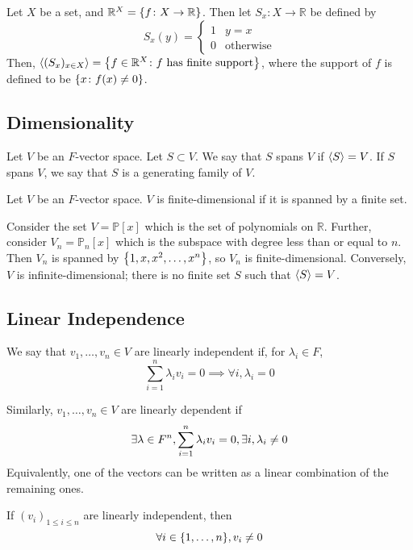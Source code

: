\begin{example}
    Let \( X \) be a set, and \( \mathbb R^X = \qty{f \colon X \to \mathbb R} \).
    Then let \( S_x \colon X \to \mathbb R \) be defined by
    \[ S_x(y) = \begin{cases}
        1 & y = x \\
        0 & \text{otherwise}
    \end{cases} \]
    Then, \( \langle{} (S_x)_{x \in X} \rangle = \qty{f \in \mathbb R^X \colon f \text{ has finite support}} \),
    where the support of \( f \) is defined to be \( \qty{x \colon f(x) \neq 0} \). %
\end{example}

\subsection{Dimensionality}
\begin{definition}
    Let \( V \) be an \( F \)-vector space.
    Let \( S \subset V \).
    We say that \( S \) spans \( V \) if \( \langle{} S \rangle = V \).
    If \( S \) spans \( V \), we say that \( S \) is a generating family of \( V \).
\end{definition}

\begin{definition}
    Let \( V \) be an \( F \)-vector space.
    \( V \) is finite-dimensional if it is spanned by a finite set.
\end{definition}
\begin{example}
    Consider the set \( V = \mathbb P[x] \) which is the set of polynomials on \( \mathbb R \).
    Further, consider \( V_n = \mathbb P_n[x] \) which is the subspace with degree less than or equal to \( n \).
    Then \( V_n \) is spanned by \( \qty{1, x, x^2, \dots, x^n} \), so \( V_n \) is finite-dimensional.
    Conversely, \( V \) is infinite-dimensional; there is no finite set \( S \) such that \( \langle{} S \rangle = V \).
\end{example}

\subsection{Linear Independence}
\begin{definition}
    We say that \( v_1, \dots, v_n \in V \) are linearly independent if, for \( \lambda_i \in F \),
    \[ \sum_{i=1}^n \lambda_i v_i = 0 \implies \forall i, \lambda_i = 0 \]
\end{definition}
\begin{definition}
    Similarly, \( v_1, \dots, v_n \in V \) are linearly dependent if
    \[ \exists \vb \lambda \in F^n, \sum_{i=1}^n \lambda_i v_i = 0, \exists i, \lambda_i \neq 0 \]
    Equivalently, one of the vectors can be written as a linear combination of the remaining ones.
\end{definition}
\begin{remark}
    If \( (v_i)_{1 \leq i \leq n} \) are linearly independent, then
    \[ \forall i \in \qty{1,\dots,n}, v_i \neq 0 \]
\end{remark}

